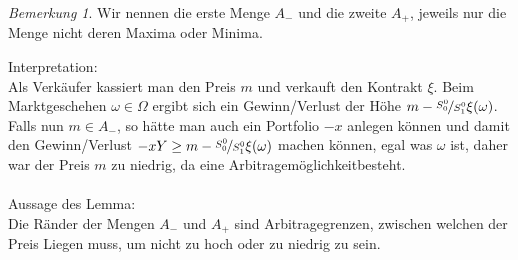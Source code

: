 \documentclass[]{scrartcl}
\numberwithin{equation}{section}
\theoremstyle{plain}
\theoremstyle{definition}
\theoremstyle{remark}
\newtheorem*{bemerkung}{Bemerkung}
\theoremstyle{proof}
\newcommand{\Ss}{\nicefrac{S_0^0}{S_1^0}}
\newcommand{\am}{Arbitragemöglichkeit}
\begin{document}
 	\begin{bemerkung}
 	 	Wir nennen die erste Menge $A_-$ und die zweite $A_+$, jeweils nur die Menge nicht deren Maxima oder Minima.
 	 \end{bemerkung}
 	 Interpretation: \\Als Verkäufer kassiert man den Preis $m$ und verkauft den Kontrakt $\xi$. Beim Marktgeschehen $\omega\in\Omega$ ergibt sich ein Gewinn/Verlust der Höhe $m-\Ss\xi(\omega)$. Falls nun $m\in A_-$, so hätte man auch ein Portfolio $-x$ anlegen können und damit den Gewinn/Verlust $-xY\ge m-\Ss\xi(\omega)$ machen können, egal was $\omega$ ist, daher war der Preis $m$ zu niedrig, da eine \am besteht.\\ \\
 	 Aussage des Lemma: \\ Die Ränder der Mengen $A_-$ und $A_+$ sind Arbitragegrenzen, zwischen welchen der Preis Liegen muss, um nicht zu hoch oder zu niedrig zu sein.
\end{document}
